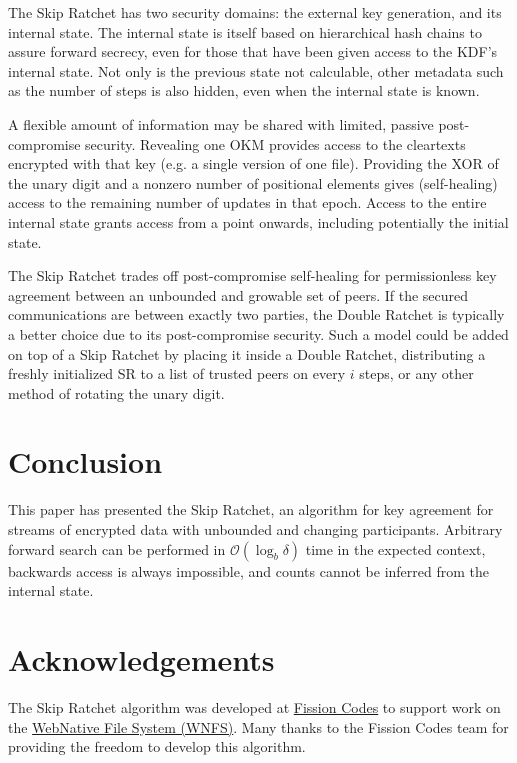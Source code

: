 \documentclass{article}
\begin{document}
	The Skip Ratchet has two security domains: the external key generation, and its internal state. The internal state is itself based on hierarchical hash chains to assure forward secrecy, even for those that have been given access to the KDF's internal state. Not only is the previous state not calculable, other metadata such as the number of steps is also hidden, even when the internal state is known.
	
	A flexible amount of information may be shared with limited, passive post-compromise security. Revealing one OKM provides access to the cleartexts encrypted with that key (e.g. a single version of one file). Providing the \textsf{XOR} of the unary digit and a nonzero number of positional elements gives (self-healing) access to the remaining number of updates in that epoch. Access to the entire internal state grants access from a point onwards, including potentially the initial state.
	
	The Skip Ratchet trades off post-compromise self-healing for permissionless key agreement between an unbounded and growable set of peers. If the secured communications are between exactly two parties, the Double Ratchet is typically a better choice due to its post-compromise security. Such a model could be added on top of a Skip Ratchet by placing it inside a Double Ratchet, distributing a freshly initialized SR to a list of trusted peers on every $i$ steps, or any other method of rotating the unary digit.
	
	\section{Conclusion}
	
	This paper has presented the Skip Ratchet, an algorithm for key agreement for streams of encrypted data with unbounded and changing participants. Arbitrary forward search can be performed in $\mathcal{O}(\log_{b} \delta)$ time in the expected context, backwards access is always impossible, and counts cannot be inferred from the internal state.
    
    \newpage
    
    \section{Acknowledgements}
    
    The Skip Ratchet algorithm was developed at \href{https://fission.codes}{Fission Codes} to support work on the \href{https://github.com/fission-suite/webnative}{WebNative File System (WNFS)}. Many thanks to the Fission Codes team for providing the freedom to develop this algorithm.
    
\end{document}
